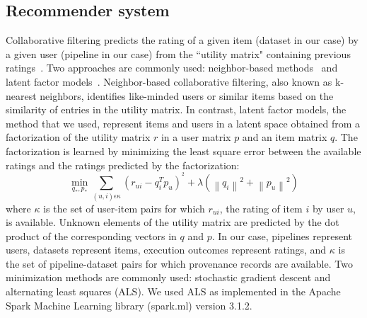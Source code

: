 \subsection{Recommender system}

Collaborative filtering predicts the rating of a given item (dataset in our
case) by a given user (pipeline in our case) from the ``utility
matrix" containing previous ratings~\cite{rajaraman2011mining}.
Two  approaches are commonly used: neighbor-based
methods~\cite{koren2015advances} and latent factor
models~\cite{koren2009matrix,bokde2015matrix}. Neighbor-based collaborative
filtering, also known as k-nearest neighbors, identifies
like-minded users or similar items based on the similarity of entries in
the utility matrix. In contrast, latent factor models, the method that we used, represent items and
users in a latent space obtained from a factorization of the
utility matrix $r$ in a user matrix $p$ and an item matrix $q$. The
factorization is learned by minimizing the least square error between the
available ratings and the ratings predicted by the factorization:
\begin{equation} \tag{1}
   \min_{q_{*},p_{*}} \sum_{(u,i) \epsilon \kappa }  (r_{ui}-q_{i}^{T}p_{u})^{^2}+\lambda \left ( \left \| q_{i}\right \|^2+\left \| p_{u}\right \|^2 \right )            \label{eq}
\end{equation}
where $\kappa$ is the set of user-item pairs for which $r_{ui}$, the rating of item
$i$ by user $u$, is available. Unknown elements of the utility matrix are
predicted by the dot product of the corresponding vectors in $q$ and $p$.
In our case, pipelines represent users, datasets represent items, execution
outcomes represent ratings, and $\kappa$ is the set of pipeline-dataset
pairs for which provenance records are available. Two minimization methods are
commonly used: stochastic gradient descent and alternating least squares
(ALS). We used ALS as implemented in the
Apache Spark Machine Learning library (spark.ml) version 3.1.2. 



